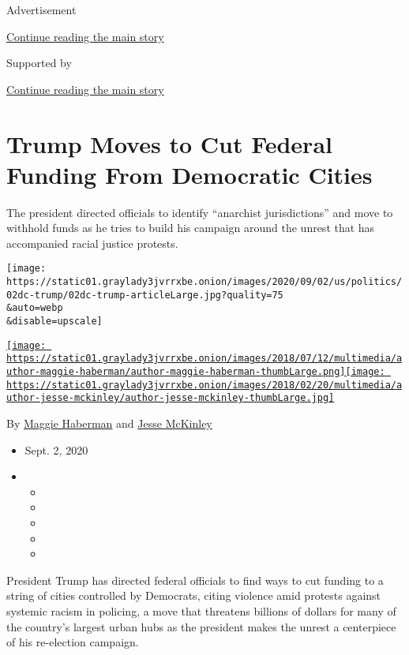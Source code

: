Advertisement

\protect\hyperlink{after-top}{Continue reading the main story}

Supported by

\protect\hyperlink{after-sponsor}{Continue reading the main story}

\hypertarget{trump-moves-to-cut-federal-funding-from-democratic-cities}{%
\section{Trump Moves to Cut Federal Funding From Democratic
Cities}\label{trump-moves-to-cut-federal-funding-from-democratic-cities}}

The president directed officials to identify ``anarchist jurisdictions''
and move to withhold funds as he tries to build his campaign around the
unrest that has accompanied racial justice protests.

\texttt{[image: https://static01.graylady3jvrrxbe.onion/images/2020/09/02/us/politics/02dc-trump/02dc-trump-articleLarge.jpg?quality=75\\\&auto=webp\\\&disable=upscale]}

\href{https://www.nytimes3xbfgragh.onion/by/maggie-haberman}{\texttt{[image: https://static01.graylady3jvrrxbe.onion/images/2018/07/12/multimedia/author-maggie-haberman/author-maggie-haberman-thumbLarge.png]}}\href{https://www.nytimes3xbfgragh.onion/by/jesse-mckinley}{\texttt{[image: https://static01.graylady3jvrrxbe.onion/images/2018/02/20/multimedia/author-jesse-mckinley/author-jesse-mckinley-thumbLarge.jpg]}}

By \href{https://www.nytimes3xbfgragh.onion/by/maggie-haberman}{Maggie
Haberman} and
\href{https://www.nytimes3xbfgragh.onion/by/jesse-mckinley}{Jesse
McKinley}

\begin{itemize}
\item
  Sept. 2, 2020
\item
  \begin{itemize}
  \item
  \item
  \item
  \item
  \item
  \end{itemize}
\end{itemize}

President Trump has directed federal officials to find ways to cut
funding to a string of cities controlled by Democrats, citing violence
amid protests against systemic racism in policing, a move that threatens
billions of dollars for many of the country's largest urban hubs as the
president makes the unrest a centerpiece of his re-election campaign.


